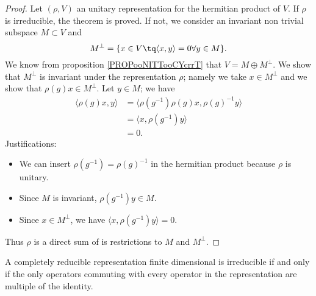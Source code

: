 \begin{proof}
    Let \( (\rho, V)\) an unitary representation for the hermitian product of \( V\). If \( \rho\) is irreducible, the theorem is proved. If not, we consider an invariant non trivial subspace \( M\subset V\) and
    \begin{equation}
        M^{\perp}=\{ x\in V\tq \langle x, y\rangle =0\forall y\in M \}.
    \end{equation}
    We know from proposition \ref{PROPooNITTooCYcrrT} that \( V=M\oplus M^{\perp}\). We show that \( M^{\perp}\) is invariant under the representation \( \rho\); namely we take \( x\in M^{\perp}\) and we show that \( \rho(g)x\in M^{\perp}\). Let \( y\in M\); we have
    \begin{subequations}
        \begin{align}
            \langle \rho(g)x, y\rangle &=\langle \rho(g^{-1})\rho(g)x, \rho(g)^{-1}y\rangle \\
            &=\langle x, \rho(g^{-1})y\rangle \\
            &=0.
        \end{align}
    \end{subequations}
    Justifications:
    \begin{itemize}
        \item We can insert \( \rho(g^{-1})=\rho(g)^{-1}\) in the hermitian product because \( \rho\) is unitary.
        \item Since \( M\) is invariant, \( \rho(g^{-1})y\in M\).
        \item Since \( x\in M^{\perp}\), we have \( \langle x, \rho(g^{-1})y\rangle =0\).
    \end{itemize}
    Thus \( \rho\) is a direct sum of is restrictions to \( M\) and \( M^{\perp}\).
\end{proof}

\begin{proposition}
    A completely reducible representation finite dimensional is irreducible if and only if the only operators commuting with every operator in the representation are multiple of the identity.
\end{proposition}

